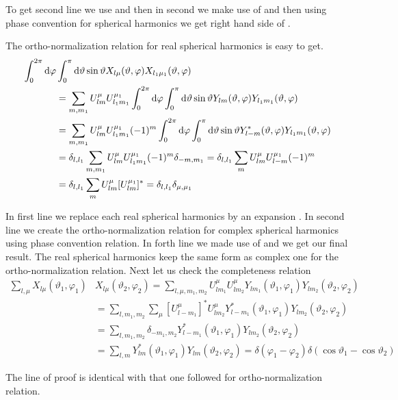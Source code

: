 \par{To get second line we use  and then in second we make use of
 and then using phase convention for spherical harmonics we get
right hand side of .}
\par{The ortho-normalization relation for real spherical harmonics is easy to
  get.}
\begin{equation}
\begin{split}
\int_{0}^{2\pi}\text{d} \varphi&  \int_{0}^{\pi}\text{d} \vartheta \sin \vartheta
X_{l\mu}(\vartheta,\varphi)X_{l_1\mu_1}(\vartheta,\varphi)\\&=\sum_{m,m_1}U_{lm}^{\mu}U_{l_1m_1}^{\mu_1}\int_{0}^{2\pi}\text{d}
\varphi \int_{0}^{\pi}\text{d} \vartheta \sin \vartheta
Y_{lm}(\vartheta,\varphi)Y_{l_1m_1}(\vartheta,\varphi)\\
&=\sum_{m,m_1}U_{lm}^{\mu}U_{l_1m_1}^{\mu_1}(-1)^m\int_{0}^{2\pi}\text{d}
\varphi \int_{0}^{\pi}\text{d} \vartheta \sin \vartheta Y_{l-m}^{*}(\vartheta,\varphi)Y_{l_1m_1}(\vartheta,\varphi)\\&=\delta_{l,l_1}\sum_{m,m_1}U_{lm}^{\mu}U_{l_1m_1}^{\mu_1}(-1)^m\delta_{-m,m_1}=\delta_{l,l_1}\sum_{m}U_{lm}^{\mu}U_{l-m}^{\mu_1}(-1)^m\\&=\delta_{l,l_1}\sum_{m}U_{lm}^{\mu}[U_{lm}^{\mu_1}]^{*}=\delta_{l,l_1}\delta_{\mu,\mu_1}
\end{split}
\end{equation}
\par{In first line we replace each real spherical harmonics by an expansion
. In second line we create the ortho-normalization relation for
complex spherical harmonics using phase convention relation. In forth line we
made use of  and we get our final result. The real spherical
harmonics keep the same form as complex one for the ortho-normalization
relation. Next let us check the completeness relation}
\begin{equation}
\begin{split}
\sum_{l,\mu}X_{l\mu}(\vartheta_1,\varphi_1)&X_{l\mu}(\vartheta_2,\varphi_2)=\sum_{l,\mu,m_1,m_2}U_{lm_1}^{\mu}U_{lm_2}^{\mu}Y_{lm_1}(\vartheta_1,\varphi_1)Y_{lm_2}(\vartheta_2,\varphi_2)\\&=\sum_{l,m_1,m_2}\sum_{\mu}[U_{l-m_1}^{\mu}]^{*}U_{lm_2}^{\mu}Y_{l-m_1}^{*}(\vartheta_1,\varphi_1)Y_{lm_2}(\vartheta_2,\varphi_2)\\&=\sum_{l,m_1,m_2}\delta_{-m_1,m_2}Y_{l-m_1}^{*}(\vartheta_1,\varphi_1)Y_{lm_2}(\vartheta_2,\varphi_2)\\&=\sum_{l,m}Y_{lm}^{*}(\vartheta_1,\varphi_1)Y_{lm}(\vartheta_2,\varphi_2)=\delta(\varphi_1-\varphi_2)\delta(\cos \vartheta_1-\cos \vartheta_2)
\end{split}
\end{equation}
\par{The line of proof is identical with that one followed for ortho-normalization relation.}
